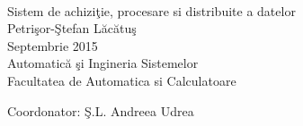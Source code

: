 \documentclass[a4paper,12pt, oneside, titlepage]{book}
\begin{document}
\pagestyle{empty}    
\begingroup
{}


\begin{titlepage}
\thispagestyle{empty}

\mbox{}\\[6pc]
\begin{center}
	\Huge{Sistem de achiziţie, procesare si distribuite a datelor}\\[2pc]
	
	\Large{Petrişor-Ştefan Lăcătuş}\\[1pc]
	\large{Septembrie 2015}\\[2pc]
	
	Automatică şi Ingineria Sistemelor\\
Facultatea de Automatica si Calculatoare
\end{center}
\vfill

\noindent Coordonator: Ş.L. Andreea Udrea

\end{titlepage}


\tableofcontents 

\endgroup %

\clearpage
\pagestyle{plain}      




 

 

 



  

\printbibliography[title={Bibliografie}] %
\end{document}
